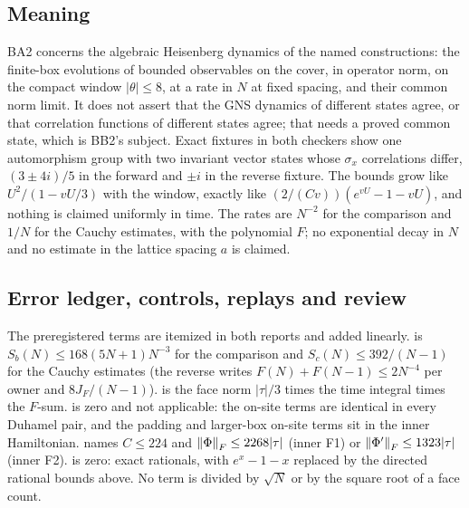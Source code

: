 \subsection{Meaning}
\label{sec:ba2-meaning}
BA2 concerns the algebraic Heisenberg dynamics of the named constructions: the
finite-box evolutions of bounded observables on the cover, in operator norm,
on the compact window $|\theta|\le8$, at a rate in $N$ at fixed spacing, and
their common norm limit. It does not assert that the GNS dynamics of
different states agree, or that correlation functions of different states
agree; that needs a proved common state, which is BB2's subject. Exact
fixtures in both checkers show one automorphism group with two invariant
vector states whose $\sigma_x$ correlations differ, $(3\pm4i)/5$ in the
forward and $\pm i$ in the reverse fixture. The bounds grow like
$U^2/(1-vU/3)$ with the window, exactly like $(2/(Cv))(e^{vU}-1-vU)$, and
nothing is claimed uniformly in time. The rates are $N^{-2}$ for the
comparison and $1/N$ for the Cauchy estimates, with the polynomial $F$; no
exponential decay in $N$ and no estimate in the lattice spacing $a$ is
claimed.

\subsection{Error ledger, controls, replays and review}
\label{sec:ba2-evidence}
The preregistered terms are itemized in both reports and added linearly.
 is $S_b(N)\le168(5N+1)N^{-3}$ for the comparison
and $S_c(N)\le392/(N-1)$ for the Cauchy estimates (the reverse writes
$F(N)+F(N-1)\le2N^{-4}$ per owner and $8J_F/(N-1)$).
 is the face norm $|\tau|/3$ times the time
integral times the $F$-sum.  is zero and not
applicable: the on-site terms are identical in every Duhamel pair, and the
padding and larger-box on-site terms sit in the inner Hamiltonian.
 names $C\le224$ and $\left\lVert\Phi\right\rVert_F\le2268|\tau|$
(inner F1) or $\left\lVert\Phi'\right\rVert_F\le1323|\tau|$ (inner F2).  is
zero: exact rationals, with $e^x-1-x$ replaced by the directed rational
bounds above. No term is divided by $\sqrt N$ or by the square root of a face
count.

